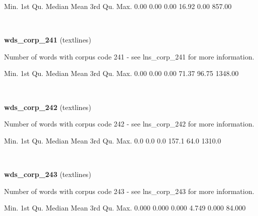 \documentclass[]{article}
\newenvironment{Shaded}{\begin{snugshade}}{\end{snugshade}}
\newcommand{\FloatTok}[1]{\textcolor[rgb]{0.00,0.00,0.81}{{#1}}}
\newcommand{\NormalTok}[1]{{#1}}
\begin{document}
\begin{Shaded}
\begin{Highlighting}[]
   \NormalTok{Min. 1st Qu.  Median    Mean 3rd Qu.    Max. }
   \FloatTok{0.00}    \FloatTok{0.00}    \FloatTok{0.00}   \FloatTok{16.92}    \FloatTok{0.00}  \FloatTok{857.00} 
\end{Highlighting}
\end{Shaded}

~

\vspace{1em}

\textbf{wds\_corp\_241} (textlines)

Number of words with corpus code 241 - see lns\_corp\_241 for more
information.

\begin{Shaded}
\begin{Highlighting}[]
   \NormalTok{Min. 1st Qu.  Median    Mean 3rd Qu.    Max. }
   \FloatTok{0.00}    \FloatTok{0.00}    \FloatTok{0.00}   \FloatTok{71.37}   \FloatTok{96.75} \FloatTok{1348.00} 
\end{Highlighting}
\end{Shaded}

~

\vspace{1em}

\textbf{wds\_corp\_242} (textlines)

Number of words with corpus code 242 - see lns\_corp\_242 for more
information.

\begin{Shaded}
\begin{Highlighting}[]
   \NormalTok{Min. 1st Qu.  Median    Mean 3rd Qu.    Max. }
    \FloatTok{0.0}     \FloatTok{0.0}     \FloatTok{0.0}   \FloatTok{157.1}    \FloatTok{64.0}  \FloatTok{1310.0} 
\end{Highlighting}
\end{Shaded}

~

\vspace{1em}

\textbf{wds\_corp\_243} (textlines)

Number of words with corpus code 243 - see lns\_corp\_243 for more
information.

\begin{Shaded}
\begin{Highlighting}[]
   \NormalTok{Min. 1st Qu.  Median    Mean 3rd Qu.    Max. }
  \FloatTok{0.000}   \FloatTok{0.000}   \FloatTok{0.000}   \FloatTok{4.749}   \FloatTok{0.000}  \FloatTok{84.000} 
\end{Highlighting}
\end{Shaded}
\end{document}
